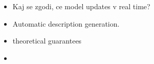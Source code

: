 

\begin{itemize}
	\item Kaj se zgodi, ce model updates v real time?
	\item Automatic description generation.
	\item theoretical guarantees
	\item  
\end{itemize}